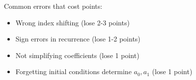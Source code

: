 \documentclass[12pt]{article}
\begin{document}
\begin{warning}
Common errors that cost points:
\begin{itemize}
\item Wrong index shifting (lose 2-3 points)
\item Sign errors in recurrence (lose 1-2 points)
\item Not simplifying coefficients (lose 1 point)
\item Forgetting initial conditions determine $a_{0}, a_{1}$ (lose 1 point)
\end{itemize}
\end{warning}
\end{document}
